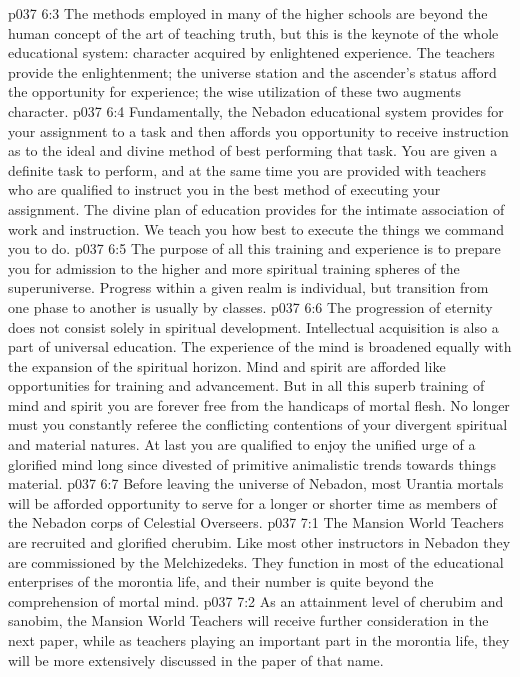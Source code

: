 \vs p037 6:3 \pc The methods employed in many of the higher schools are beyond the human concept of the art of teaching truth, but this is the keynote of the whole educational system: character acquired by enlightened experience. The teachers provide the enlightenment; the universe station and the ascender’s status afford the opportunity for experience; the wise utilization of these two augments character.
\vs p037 6:4 Fundamentally, the Nebadon educational system provides for your assignment to a task and then affords you opportunity to receive instruction as to the ideal and divine method of best performing that task. You are given a definite task to perform, and at the same time you are provided with teachers who are qualified to instruct you in the best method of executing your assignment. The divine plan of education provides for the intimate association of work and instruction. We teach you how best to execute the things we command you to do.
\vs p037 6:5 \pc The purpose of all this training and experience is to prepare you for admission to the higher and more spiritual training spheres of the superuniverse. Progress within a given realm is individual, but transition from one phase to another is usually by classes.
\vs p037 6:6 The progression of eternity does not consist solely in spiritual development. Intellectual acquisition is also a part of universal education. The experience of the mind is broadened equally with the expansion of the spiritual horizon. Mind and spirit are afforded like opportunities for training and advancement. But in all this superb training of mind and spirit you are forever free from the handicaps of mortal flesh. No longer must you constantly referee the conflicting contentions of your divergent spiritual and material natures. At last you are qualified to enjoy the unified urge of a glorified mind long since divested of primitive animalistic trends towards things material.
\vs p037 6:7 \pc Before leaving the universe of Nebadon, most Urantia mortals will be afforded opportunity to serve for a longer or shorter time as members of the Nebadon corps of Celestial Overseers.
\vs p037 7:1 The Mansion World Teachers are recruited and glorified cherubim. Like most other instructors in Nebadon they are commissioned by the Melchizedeks. They function in most of the educational enterprises of the morontia life, and their number is quite beyond the comprehension of mortal mind.
\vs p037 7:2 As an attainment level of cherubim and sanobim, the Mansion World Teachers will receive further consideration in the next paper, while as teachers playing an important part in the morontia life, they will be more extensively discussed in the paper of that name.

